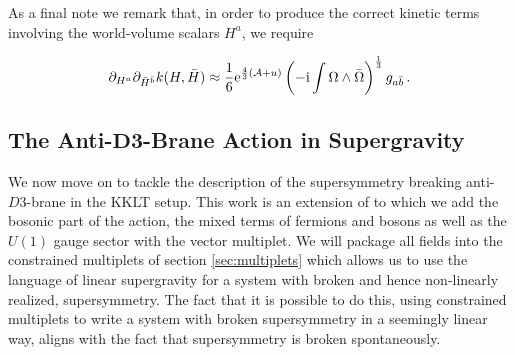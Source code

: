 \documentclass[a4paper,12pt]{report}
\newcommand{\be}{\begin{equation}}
\newcommand{\ee}{\end{equation}}
\def\rmi{{\rm i}}
\def\rme{{\rm e}}
\begin{document}
As a final note we remark that, in order to produce the correct kinetic terms involving the world-volume scalars $H^a$, we require

\be
\partial_{H^a}\partial_{\bar{H}^{\bar{b}}} k(H,\bar{H}) \approx \frac{1}{6} \rme^{\frac{4}{3} (\mathcal{A} + u )} \left(-\rmi \int \Omega \wedge \bar{\Omega} \right)^{\frac{1}{3}} g_{a\bar{b}}\,.
\ee

\subsection[The Anti-$D3$-Brane Action in Supergravity]{The Anti-$\mathbf{D3}$-Brane Action in Supergravity}
\label{sec:sugraact}
We now move on to tackle the description of the supersymmetry breaking anti-$D3$-brane in the KKLT setup. This work is an extension of \cite{GarciadelMoral:2017vnz} to which we add the bosonic part of the action, the mixed terms of fermions and bosons as well as the $U(1)$ gauge sector with the vector multiplet. We will package all fields into the constrained multiplets of section \ref{sec:multiplets} which allows us to use the language of linear supergravity for a system with broken and hence non-linearly realized, supersymmetry. The fact that it is possible to do this, using constrained multiplets to write a system with broken supersymmetry in a seemingly linear way, aligns with the fact that supersymmetry is broken spontaneously.
\end{document}

